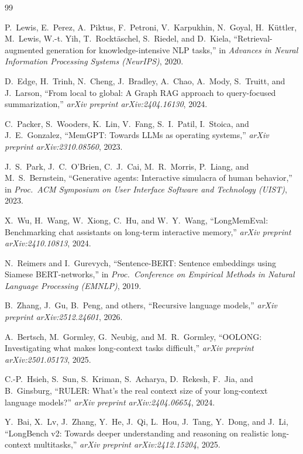 \documentclass[conference]{IEEEtran}
\begin{document}
\begin{thebibliography}{99}

P.~Lewis, E.~Perez, A.~Piktus, F.~Petroni, V.~Karpukhin, N.~Goyal, H.~K\"{u}ttler,
M.~Lewis, W.-t. Yih, T.~Rockt\"{a}schel, S.~Riedel, and D.~Kiela,
``Retrieval-augmented generation for knowledge-intensive {NLP} tasks,''
in \emph{Advances in Neural Information Processing Systems (NeurIPS)}, 2020.

D.~Edge, H.~Trinh, N.~Cheng, J.~Bradley, A.~Chao, A.~Mody, S.~Truitt, and J.~Larson,
``From local to global: A {Graph RAG} approach to query-focused summarization,''
\emph{arXiv preprint arXiv:2404.16130}, 2024.

C.~Packer, S.~Wooders, K.~Lin, V.~Fang, S.~I.~Patil, I.~Stoica, and J.~E.~Gonzalez,
``{MemGPT}: Towards {LLMs} as operating systems,''
\emph{arXiv preprint arXiv:2310.08560}, 2023.

J.~S.~Park, J.~C.~O'Brien, C.~J.~Cai, M.~R.~Morris, P.~Liang, and M.~S.~Bernstein,
``Generative agents: Interactive simulacra of human behavior,''
in \emph{Proc.\ ACM Symposium on User Interface Software and Technology (UIST)}, 2023.

X.~Wu, H.~Wang, W.~Xiong, C.~Hu, and W.~Y.~Wang,
``{LongMemEval}: Benchmarking chat assistants on long-term interactive memory,''
\emph{arXiv preprint arXiv:2410.10813}, 2024.

N.~Reimers and I.~Gurevych,
``Sentence-{BERT}: Sentence embeddings using {Siamese BERT}-networks,''
in \emph{Proc.\ Conference on Empirical Methods in Natural Language Processing (EMNLP)},
2019.

B.~Zhang, J.~Gu, B.~Peng, and others,
``Recursive language models,''
\emph{arXiv preprint arXiv:2512.24601}, 2026.

A.~Bertsch, M.~Gormley, G.~Neubig, and M.~R.~Gormley,
``{OOLONG}: Investigating what makes long-context tasks difficult,''
\emph{arXiv preprint arXiv:2501.05173}, 2025.

C.-P.~Hsieh, S.~Sun, S.~Kriman, S.~Acharya, D.~Rekesh, F.~Jia, and B.~Ginsburg,
``{RULER}: What's the real context size of your long-context language models?''
\emph{arXiv preprint arXiv:2404.06654}, 2024.

Y.~Bai, X.~Lv, J.~Zhang, Y.~He, J.~Qi, L.~Hou, J.~Tang, Y.~Dong, and J.~Li,
``{LongBench v2}: Towards deeper understanding and reasoning on realistic long-context
multitasks,''
\emph{arXiv preprint arXiv:2412.15204}, 2025.

\end{thebibliography}
\end{document}
